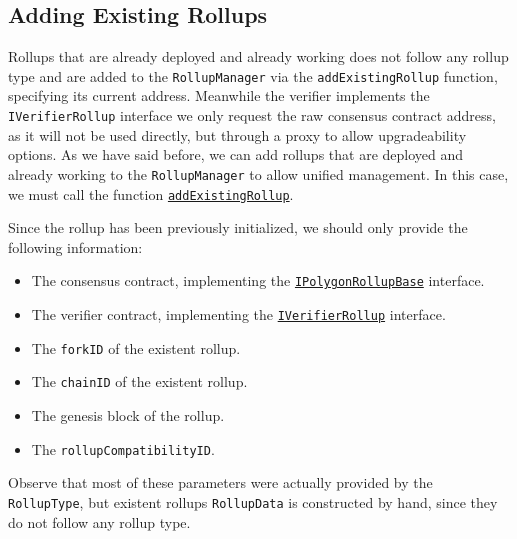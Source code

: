 \subsection{Adding Existing Rollups}


Rollups that are already deployed and already working does not follow any rollup type and are added to the \texttt{RollupManager} via the \texttt{addExistingRollup} function, specifying its current address. Meanwhile the verifier implements the \texttt{IVerifierRollup} interface we only request the raw consensus contract address, as it will not be used directly, but through a proxy to allow upgradeability options. As we have said before, we can add rollups that are deployed and already working to the \texttt{RollupManager} to allow unified management. In this case, we must call the function  \href{https://github.com/0xPolygonHermez/zkevm-contracts/blob/8fc03b0e83cbb143fdc6c1ecfaafa5c294c25509/contracts/v2/PolygonRollupManager.sol\#L640C14-L640C31}{\texttt{addExistingRollup}}.

Since the rollup has been previously initialized, we should only provide the following information:

\begin{itemize}
\item The consensus contract, implementing the \href{https://github.com/0xPolygonHermez/zkevm-contracts/blob/develop/contracts/v2/interfaces/IPolygonRollupBase.sol}{\texttt{IPolygonRollupBase}} interface.
\item The verifier contract, implementing the \href{https://github.com/0xPolygonHermez/zkevm-contracts/blob/develop/contracts/interfaces/IVerifierRollup.sol}{\texttt{IVerifierRollup}} interface.
\item The \texttt{forkID} of the existent rollup.
\item The \texttt{chainID} of the existent rollup.
\item The genesis block of the rollup.
\item The \texttt{rollupCompatibilityID}.
\end{itemize}

Observe that most of these parameters were actually provided by the \texttt{RollupType}, but existent rollups \texttt{RollupData} is constructed by hand, since they do not follow any rollup type.









